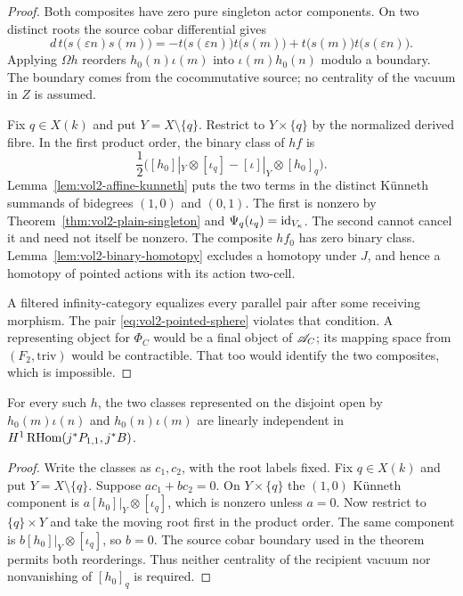 \begin{proof}
Both composites have zero pure singleton actor components.
On two distinct roots the source cobar differential gives
\[
 d\,t\bigl(s(\varepsilon n)s(m)\bigr)
 =-t\bigl(s(\varepsilon n)\bigr)t\bigl(s(m)\bigr)
   +t\bigl(s(m)\bigr)t\bigl(s(\varepsilon n)\bigr).
\]
Applying $\Omega h$ reorders $h_0(n)\iota(m)$ into
$\iota(m)h_0(n)$ modulo a boundary.
The boundary comes from the cocommutative source; no centrality
of the vacuum in $Z$ is assumed.

Fix $q\in X(k)$ and put $Y=X\setminus\{q\}$.
Restrict to $Y\times\{q\}$ by the normalized derived fibre.
In the first product order, the binary class of $hf$ is
\begin{equation}\label{eq:vol2-sphere-binary-class}
 \frac12\bigl([h_0]|_Y\otimes[\iota_q]
                  -[\iota]|_Y\otimes[h_0]_q\bigr).
\end{equation}
Lemma~\ref{lem:vol2-affine-kunneth} puts the two terms in the
distinct K\"unneth summands of bidegrees $(1,0)$ and $(0,1)$.
The first is nonzero by Theorem~\ref{thm:vol2-plain-singleton}
and $\Psi_q(\iota_q)=\mathrm{id}_{V_\kappa}$.
The second cannot cancel it and need not itself be nonzero.
The composite $hf_0$ has zero binary class.
Lemma~\ref{lem:vol2-binary-homotopy} excludes a homotopy under
$J$, and hence a homotopy of pointed actions with its action
two-cell.

A filtered infinity-category equalizes every parallel pair
after some receiving morphism. The pair
\eqref{eq:vol2-pointed-sphere} violates that condition.
A representing object for $\Phi_C$ would be a final object of
$\mathscr A_C$; its mapping space from $(F_2,\mathrm{triv})$ would
be contractible. That too would identify the two composites,
which is impossible.
\end{proof}

\begin{corollary}\label{cor:vol2-independent-unit-products}
For every such $h$, the two classes represented on the disjoint
open by $h_0(m)\iota(n)$ and $h_0(n)\iota(m)$ are linearly
independent in $H^1\operatorname{RHom}(j^*P_{1,1},j^*B)$.
\end{corollary}

\begin{proof}
Write the classes as $c_1,c_2$, with the root labels fixed.
Fix $q\in X(k)$ and put $Y=X\setminus\{q\}$.
Suppose $a c_1+b c_2=0$. On $Y\times\{q\}$ the
$(1,0)$ K\"unneth component is
$a[h_0]|_Y\otimes[\iota_q]$, which is nonzero unless $a=0$.
Now restrict to $\{q\}\times Y$ and take the moving root first
in the product order. The same component is
$b[h_0]|_Y\otimes[\iota_q]$, so $b=0$.
The source cobar boundary used in the theorem permits both
reorderings. Thus neither centrality of the recipient vacuum nor
nonvanishing of $[h_0]_q$ is required.
\end{proof}


